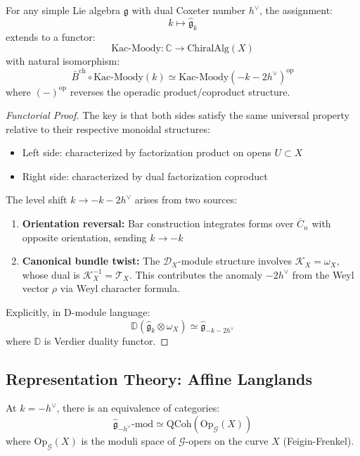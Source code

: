 \begin{theorem}
\label{thm:kac-moody-koszul-universal}
For any simple Lie algebra $\mathfrak{g}$ with dual Coxeter number $h^\vee$, the assignment:
$$k \mapsto \widehat{\mathfrak{g}}_k$$
extends to a functor:
$$\text{Kac-Moody}: \mathbb{C} \to \text{ChiralAlg}(X)$$
with natural isomorphism:
$$\bar{B}^{\text{ch}} \circ \text{Kac-Moody}(k) \simeq \text{Kac-Moody}(-k-2h^\vee)^{\text{op}}$$
where $(-)^{\text{op}}$ reverses the operadic product/coproduct structure.
\end{theorem}

\begin{proof}[Functorial Proof]
The key is that both sides satisfy the same universal property relative to their respective monoidal structures:
\begin{itemize}
\item Left side: characterized by factorization product on opens $U \subset X$
\item Right side: characterized by dual factorization coproduct
\end{itemize}

The level shift $k \to -k-2h^\vee$ arises from two sources:
\begin{enumerate}
\item \textbf{Orientation reversal:} Bar construction integrates forms over $\overline{C}_n$ with opposite orientation, sending $k \to -k$
\item \textbf{Canonical bundle twist:} The $\mathcal{D}_X$-module structure involves $\mathcal{K}_X = \omega_X$, whose dual is $\mathcal{K}_X^{-1} = \mathcal{T}_X$. This contributes the anomaly $-2h^\vee$ from the Weyl vector $\rho$ via Weyl character formula.
\end{enumerate}

Explicitly, in D-module language:
$$\mathbb{D}(\widehat{\mathfrak{g}}_k \otimes \omega_X) \simeq \widehat{\mathfrak{g}}_{-k-2h^\vee}$$
where $\mathbb{D}$ is Verdier duality functor.
\end{proof}

\subsection{Representation Theory: Affine Langlands}

\begin{theorem}
At $k = -h^\vee$, there is an equivalence of categories:
$$\widehat{\mathfrak{g}}_{-h^\vee}\text{-mod} \simeq \text{QCoh}(\text{Op}_{\mathcal{G}}(X))$$
where $\text{Op}_{\mathcal{G}}(X)$ is the moduli space of $\mathcal{G}$-opers on the curve $X$ (Feigin-Frenkel).
\end{theorem}

